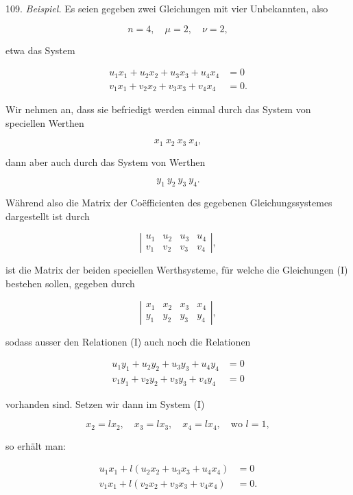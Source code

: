 \documentclass[11pt]{article}
\providecommand{\weberpage}[1]{}
\providecommand{\weq}[2]{\begin{equation}\tag{#1}#2\end{equation}}
\begin{document}
109. \textit{Beispiel.} Es seien gegeben zwei Gleichungen mit vier Unbekannten, also

\[
n=4,\quad \mu=2,\quad \nu=2,
\]

etwa das System

\weq{I}{
\begin{aligned}
u_1 x_1 + u_2 x_2 + u_3 x_3 + u_4 x_4 &= 0 \\
v_1 x_1 + v_2 x_2 + v_3 x_3 + v_4 x_4 &= 0.
\end{aligned}
}

Wir nehmen an, dass sie befriedigt werden einmal durch das System von speciellen Werthen

\[
x_1\ x_2\ x_3\ x_4,
\]

dann aber auch durch das System von Werthen

\[
y_1\ y_2\ y_3\ y_4.
\]


\weberpage{115}

Während also die Matrix der Co\"efficienten des gegebenen Gleichungssystemes dargestellt ist durch

\weq{1}{\left| \begin{array}{cccc} u_1 & u_2 & u_3 & u_4 \\ v_1 & v_2 & v_3 & v_4 \end{array} \right|,}

ist die Matrix der beiden speciellen Werthsysteme, für welche die Gleichungen (I) bestehen sollen, gegeben durch

\weq{2}{\left| \begin{array}{cccc} x_1 & x_2 & x_3 & x_4 \\ y_1 & y_2 & y_3 & y_4 \end{array} \right|,}

sodass ausser den Relationen (I) auch noch die Relationen

\weq{II}{\begin{aligned} u_1y_1+u_2y_2+u_3y_3+u_4y_4&=0\\ v_1y_1+v_2y_2+v_3y_3+v_4y_4&=0 \end{aligned}}

vorhanden sind. Setzen wir dann im System (I)

\[ x_2=lx_2,\quad x_3=lx_3,\quad x_4=lx_4,\quad \text{wo } l=1, \]

so erhält man:

\[ \begin{aligned} u_1x_1+l(u_2x_2+u_3x_3+u_4x_4)&=0\\ v_1x_1+l(v_2x_2+v_3x_3+v_4x_4)&=0. \end{aligned} \]
\end{document}
